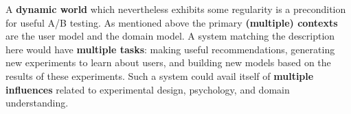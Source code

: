 A \textbf{dynamic world} which nevertheless exhibits some regularity
is a precondition for useful A/B testing.  As mentioned above the
primary \textbf{(multiple) contexts} are the user model and the domain
model.  A system matching the description here would have
\textbf{multiple tasks}: making useful recommendations, generating new
experiments to learn about users, and building new models based on the
results of these experiments.  Such a system could avail itself of
\textbf{multiple influences} related to experimental design,
psychology, and domain understanding.

